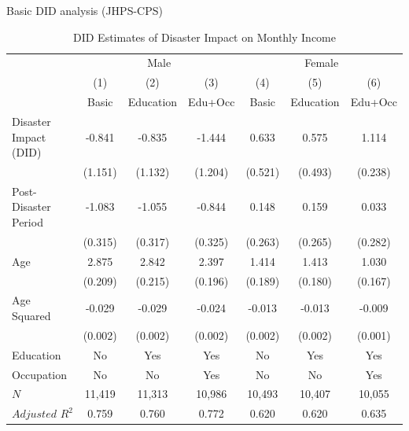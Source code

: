 \documentclass[serif, aspectratio=169]{beamer}
\begin{document}
\begin{frame}

Basic DID analysis (JHPS-CPS)

\vspace{-0.3cm}

\begin{table}[htbp]
\centering
\caption{DID Estimates of Disaster Impact on Monthly Income}

\begin{tabular}{@{}l*{6}{c}@{}}
          &\multicolumn{3}{c}{Male}                                &\multicolumn{3}{c}{Female}                              \\\cmidrule(lr){2-4}\cmidrule(lr){5-7}
          &\multicolumn{1}{c}{(1)}&\multicolumn{1}{c}{(2)}&\multicolumn{1}{c}{(3)}&\multicolumn{1}{c}{(4)}&\multicolumn{1}{c}{(5)}&\multicolumn{1}{c}{(6)}\\
          &\multicolumn{1}{c}{Basic}&\multicolumn{1}{c}{Education}&\multicolumn{1}{c}{Edu+Occ}&\multicolumn{1}{c}{Basic}&\multicolumn{1}{c}{Education}&\multicolumn{1}{c}{Edu+Occ}\\
\toprule
Disaster Impact (DID)&   -0.841         &   -0.835         &   -1.444         &    0.633         &    0.575         &    1.114\sym{***}\\
          &  (1.151)         &  (1.132)         &  (1.204)         &  (0.521)         &  (0.493)         &  (0.238)         \\
\addlinespace
Post-Disaster Period&   -1.083\sym{***}&   -1.055\sym{***}&   -0.844\sym{**} &    0.148         &    0.159         &    0.033         \\
          &  (0.315)         &  (0.317)         &  (0.325)         &  (0.263)         &  (0.265)         &  (0.282)         \\
\addlinespace
Age       &    2.875\sym{***}&    2.842\sym{***}&    2.397\sym{***}&    1.414\sym{***}&    1.413\sym{***}&    1.030\sym{***}\\
          &  (0.209)         &  (0.215)         &  (0.196)         &  (0.189)         &  (0.180)         &  (0.167)         \\
\addlinespace
Age Squared&   -0.029\sym{***}&   -0.029\sym{***}&   -0.024\sym{***}&   -0.013\sym{***}&   -0.013\sym{***}&   -0.009\sym{***}\\
          &  (0.002)         &  (0.002)         &  (0.002)         &  (0.002)         &  (0.002)         &  (0.001)         \\
\midrule
Education &       No         &      Yes         &      Yes         &       No         &      Yes         &      Yes         \\
Occupation&       No         &       No         &      Yes         &       No         &       No         &      Yes         \\
$\textit{N}$&   11,419         &   11,313         &   10,986         &   10,493         &   10,407         &   10,055         \\
$\textit{Adjusted R}^2$&    0.759         &    0.760         &    0.772         &    0.620         &    0.620         &    0.635         \\
\bottomrule
\end{tabular}


\end{table}
\end{frame}
\end{document}
